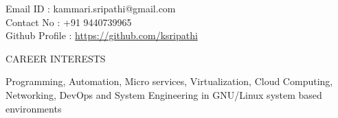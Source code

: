 \documentclass{resume} %
\newcommand{\blank}[1]{\hspace*{#1}}
\begin{document}
\blank{5 cm}
{Email ID} \blank{0.7 cm} :
kammari.sripathi@gmail.com \\
\blank{5 cm} 
{Contact No} \blank{0.3 cm} :
+91 9440739965 \\
\blank{5 cm}
{Github Profile : }
\url{https://github.com/ksripathi}
\sectionlineskip \\


\begin{rSection}{CAREER INTERESTS}
  
  { Programming, Automation, Micro services, Virtualization, Cloud
    Computing, Networking, DevOps and System Engineering in GNU/Linux
    system based environments }

\end{rSection}

\end{document}
